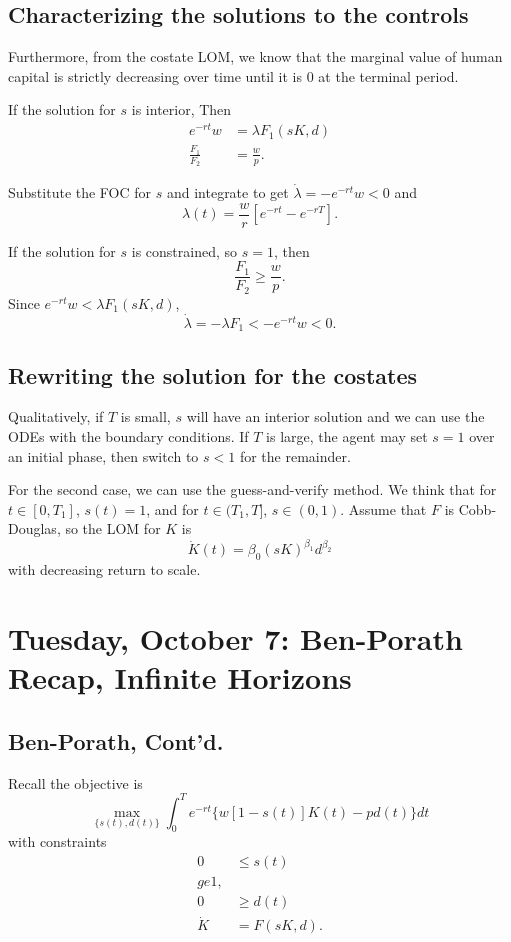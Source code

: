 \documentclass{tufte-handout}
\theoremstyle{definition}
\begin{document}
\subsection{Characterizing the solutions to the controls}

Furthermore, from the costate LOM, we know that the marginal value of human capital is strictly decreasing over time until it is $0$ at the terminal period. 

If the solution for $s$ is interior, Then
\begin{align*}
	e^{-rt}w &= \lambda F_1(sK,d) \\
	\frac{F_1}{F_2} &= \frac{w}{p} 
.\end{align*}

Substitute the FOC for $s$ and integrate to get $\dot{\lambda} = -e^{-rt}w < 0$ and \[
	\lambda(t) = \frac{w}{r} \left[ e^{-rt} - e^{-rT} \right] 
.\] 

If the solution for $s$ is constrained, so $s=1$, then \[
	\frac{F_1}{F_2} \ge \frac{w}{p}
.\] Since $e^{-rt}w < \lambda F_1(sK,d)$, \[
	\dot{\lambda} = -\lambda F_1 < -e^{-rt}w < 0
.\] 

\subsection{Rewriting the solution for the costates}

Qualitatively, if $T$ is small, $s$ will have an interior solution and we can use the ODEs with the boundary conditions. If $T$ is large, the agent may set $s=1$ over an initial phase, then switch to $s<1$ for the remainder.

For the second case, we can use the guess-and-verify method. We think that for $t \in [0,T_1]$, $s(t) = 1$, and for $t \in (T_1, T]$, $s\in(0,1)$. Assume that $F$ is Cobb-Douglas, so the LOM for $K$ is \[
	\dot{K}(t) = \beta_0 \left( sK \right)^{\beta_1} d^{\beta_2}
\] with decreasing return to scale.

\section{Tuesday, October 7: Ben-Porath Recap, Infinite Horizons}

\subsection{Ben-Porath, Cont'd.}

Recall the objective is \[
	\max_{\{s(t), d(t)\}} \int_{0}^{T} e^{-rt} \{w\left[ 1-s(t) \right] K(t) - pd(t) \}dt
\] with constraints
\begin{align*}
	0 &\le s(t) \\ge 1, \\
	0 &\ge d(t) \\
	\dot{K} &= F(sK,d)
.\end{align*}
\end{document}
